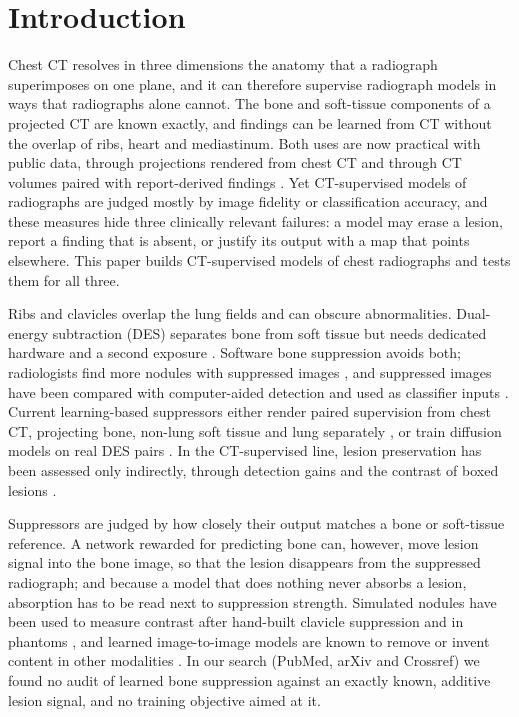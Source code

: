 \section{Introduction}
\label{sec:intro}
Chest CT resolves in three dimensions the anatomy that a radiograph superimposes on one plane, and it can therefore supervise radiograph
models in ways that radiographs alone cannot. The bone and soft-tissue components of a projected CT are known exactly, and findings can be
learned from CT without the overlap of ribs, heart and mediastinum. Both uses are now practical with public data, through projections
rendered from chest CT \citep{angaitkar2026anatomy} and through CT volumes paired with report-derived findings \citep{hamamci2026ctrate}.
Yet CT-supervised models of radiographs are judged mostly by image fidelity or classification accuracy, and these measures hide three
clinically relevant failures: a model may erase a lesion, report a finding that is absent, or justify its output with a map that points
elsewhere. This paper builds CT-supervised models of chest radiographs and tests them for all three.

Ribs and clavicles overlap the lung fields and can obscure abnormalities. Dual-energy subtraction (DES) separates bone from soft tissue but
needs dedicated hardware and a second exposure \citep{kuhlman2006des,sun2026bsldm}. Software bone suppression avoids both; radiologists find
more nodules with suppressed images \citep{freedman2011lung}, and suppressed images have been compared with computer-aided detection
\citep{schalekamp2014cad} and used as classifier inputs \citep{rajaraman2021bone}. Current learning-based suppressors either render paired
supervision from chest CT, projecting bone, non-lung soft tissue and lung separately \citep{angaitkar2026anatomy}, or train diffusion models
on real DES pairs \citep{chen2024bsdiff,sun2026bsldm,sun2025gllcm,sun2026debonedit}. In the CT-supervised line, lesion preservation has been
assessed only indirectly, through detection gains and the contrast of boxed lesions \citep{angaitkar2026anatomy}.

Suppressors are judged by how closely their output matches a bone or soft-tissue reference. A network rewarded for predicting bone can,
however, move lesion signal into the bone image, so that the lesion disappears from the suppressed radiograph; and because a model that does
nothing never absorbs a lesion, absorption has to be read next to suppression strength. Simulated nodules have been used to measure contrast
after hand-built clavicle suppression and in phantoms \citep{hogeweg2013suppression,takagi2020dose}, and learned image-to-image models are
known to remove or invent content in other modalities
\citep{cohen2018distribution,antun2020instabilities,bhadra2021hallucinations,tivnan2024hallucination}. In our search (PubMed, arXiv and
Crossref) we found no audit of learned bone suppression against an exactly known, additive lesion signal, and no training objective aimed
at it.

